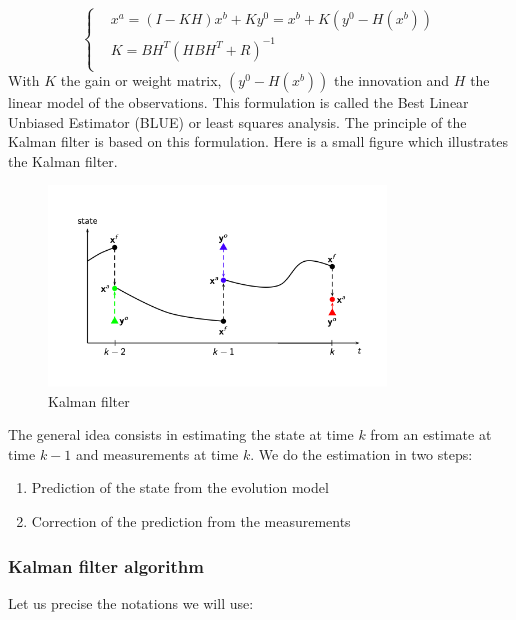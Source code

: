 $$\left\{\begin{aligned}
		&x^a=(I-KH)x^b+Ky^0=x^b+K(y^0-H(x^b)) \\
        &K=BH^T(HBH^T+R)^{-1} \\
	\end{aligned}\right.$$
With $K$ the gain or weight matrix, $(y^0-H(x^b))$ the innovation and $H$ the linear model of the observations.
This formulation is called the Best Linear Unbiased Estimator (BLUE) or least squares analysis.
The principle of the Kalman filter is based on this formulation. Here is a small figure which illustrates the Kalman filter.
\vspace*{5mm}
\begin{figure}[H]
    \centering
		\includegraphics[width=0.8\textwidth]{"images/enkf/schema_kalman_filter.png"}
	\caption{Kalman filter}
\end{figure}
The general idea consists in estimating the state at time $k$ from an estimate at time $k-1$ and measurements at time $k$.
We do the estimation in two steps:
\begin{enumerate}[label=\textbullet]
		\item Prediction of the state from the evolution model
		\item Correction of the prediction from the measurements
	\end{enumerate}

\subsubsection{Kalman filter algorithm}
Let us precise the notations we will use:

